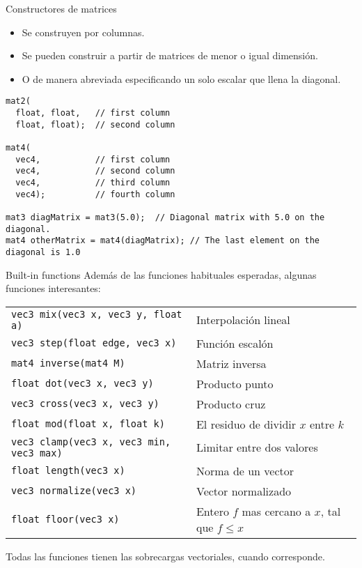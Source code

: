 \begin{frame}[fragile]{Constructores de matrices}
\begin{itemize}
    \item Se construyen por columnas.
    \item Se pueden construir a partir de matrices de menor o igual dimensión.
    \item O de manera abreviada especificando un solo escalar que llena la diagonal.
\end{itemize}
\begin{listing}
\begin{verbatim}
mat2(
  float, float,   // first column
  float, float);  // second column

mat4(
  vec4,           // first column
  vec4,           // second column
  vec4,           // third column
  vec4);          // fourth column

mat3 diagMatrix = mat3(5.0);  // Diagonal matrix with 5.0 on the diagonal.
mat4 otherMatrix = mat4(diagMatrix); // The last element on the diagonal is 1.0
\end{verbatim}
\end{listing}
\end{frame}

\begin{frame}{Built-in functions}
Además de las funciones habituales esperadas, algunas funciones interesantes:
\begin{table}[htb]
  \begin{center}
    \begin{tabular}{l | l }
      \texttt{vec3 mix(vec3 x, vec3 y, float a)} & Interpolación lineal \\
      \texttt{vec3 step(float edge, vec3 x)} & Función escalón \\
      \texttt{mat4 inverse(mat4 M)} & Matriz inversa \\
      \texttt{float dot(vec3 x, vec3 y)} & Producto punto \\
      \texttt{vec3 cross(vec3 x, vec3 y)} & Producto cruz \\
      \texttt{float mod(float x, float k)} & El residuo de dividir $x$ entre $k$ \\
      \texttt{vec3 clamp(vec3 x, vec3 min, vec3 max)} & Limitar entre dos valores \\
      \texttt{float length(vec3 x)} & Norma de un vector \\
      \texttt{vec3 normalize(vec3 x)} & Vector normalizado \\
      \texttt{float floor(vec3 x)} & Entero $f$ mas cercano a $x$, tal que $f \leq x$ \\
    \end{tabular}
  \end{center}
\end{table}
Todas las funciones tienen las sobrecargas vectoriales, cuando corresponde.
\end{frame}
